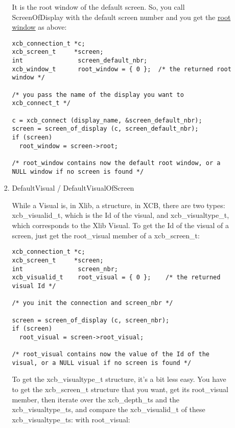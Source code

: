 \documentclass[12pt,oneside,titlepage]{book}
\begin{document}
\begin{enumerate}
\begin{enumerate}
\begin{enumerate}
      It is the root window of the default screen. So, you call
      \protect\hypertarget{ScreenOfDisplay}{}{ScreenOfDisplay} with the
      default screen number and you get the
      \protect\hyperlink{RootWindow}{root window} as above:

\begin{verbatim}
xcb_connection_t *c;
xcb_screen_t     *screen;
int               screen_default_nbr;
xcb_window_t      root_window = { 0 };  /* the returned root window */

/* you pass the name of the display you want to xcb_connect_t */

c = xcb_connect (display_name, &screen_default_nbr);
screen = screen_of_display (c, screen_default_nbr);
if (screen)
  root_window = screen->root;

/* root_window contains now the default root window, or a NULL window if no screen is found */
\end{verbatim}
    \item
      \protect\hypertarget{DefaultVisual}{}{DefaultVisual /
      DefaultVisualOfScreen}

      While a Visual is, in Xlib, a structure, in XCB, there are two
      types: {xcb\_visualid\_t}, which is the Id of the visual, and
      {xcb\_visualtype\_t}, which corresponds to the Xlib Visual. To get
      the Id of the visual of a screen, just get the {root\_visual}
      member of a {xcb\_screen\_t}:

\begin{verbatim}
xcb_connection_t *c;
xcb_screen_t     *screen;
int               screen_nbr;
xcb_visualid_t    root_visual = { 0 };    /* the returned visual Id */

/* you init the connection and screen_nbr */

screen = screen_of_display (c, screen_nbr);
if (screen)
  root_visual = screen->root_visual;

/* root_visual contains now the value of the Id of the visual, or a NULL visual if no screen is found */
\end{verbatim}

      To get the {xcb\_visualtype\_t} structure, it's a bit less easy.
      You have to get the {xcb\_screen\_t} structure that you want, get
      its {root\_visual} member, then iterate over the {xcb\_depth\_t}s
      and the {xcb\_visualtype\_t}s, and compare the {xcb\_visualid\_t}
      of these {xcb\_visualtype\_t}s: with {root\_visual}:


\end{enumerate}
\end{enumerate}
\end{enumerate}
\end{document}
